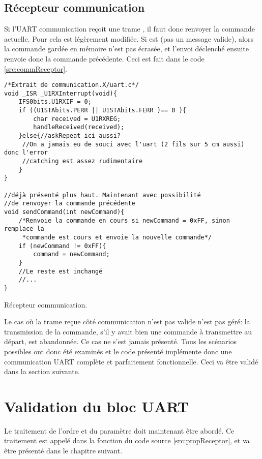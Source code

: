 \subsection{Récepteur communication}
Si l'UART communication reçoit une trame , il faut donc renvoyer la commande actuelle. Pour cela  est légèrement modifiée. Si  est  (pas un message valide), alors la commande gardée en mémoire n'est pas écrasée, et l'envoi déclenché ensuite renvoie donc la commande précédente. Ceci est fait dans le code \ref{src:commReceptor}.
\begin{listing}[htbp]
\begin{verbatim}
/*Extrait de communication.X/uart.c*/
void _ISR _U1RXInterrupt(void){
    IFS0bits.U1RXIF = 0;
    if ((U1STAbits.PERR || U1STAbits.FERR )== 0 ){
        char received = U1RXREG;
        handleReceived(received);
    }else{//askRepeat ici aussi?
     //On a jamais eu de souci avec l'uart (2 fils sur 5 cm aussi) donc l'error
     //catching est assez rudimentaire
    }
}

//déjà présenté plus haut. Maintenant avec possibilité
//de renvoyer la commande précédente
void sendCommand(int newCommand){
    /*Renvoie la commande en cours si newCommand = 0xFF, sinon remplace la
     *commande est cours et envoie la nouvelle commande*/
    if (newCommand != 0xFF){
        command = newCommand;
    }
    //Le reste est inchangé
    //...
}
\end{verbatim}
\caption{Récepteur communication.\label{src:commReceptor}}
\end{listing}
Le cas où la trame reçue côté communication n'est pas valide n'est pas géré: la transmission de la commande, s'il y avait bien une commande à transmettre au départ, est abandonnée. Ce cas ne s'est jamais présenté. Tous les scénarios possibles ont donc été examinés et le code présenté implémente donc une communication UART complète et parfaitement fonctionnelle. Ceci va être validé dans la section suivante.

\section{Validation du bloc UART}




Le traitement de l'ordre et du paramètre doit maintenant être abordé. Ce traitement est appelé dans la fonction  du code source \ref{src:propReceptor}, et va être présenté dans le chapitre suivant.